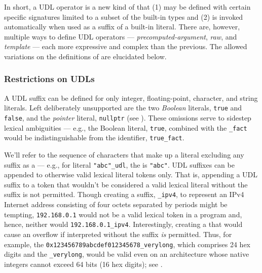 \noindent In short, a UDL operator is a new kind of  that
(1) may be defined with certain specific signatures limited to a subset
of the built-in types and (2) is invoked automatically when used as a
suffix of a built-in literal. There are, however, multiple ways to
define UDL operators --- \emph{precomputed-argument}, \emph{raw}, and
\emph{template} --- each more expressive and complex than the previous.
The allowed variations on the definitions of 
are elucidated below.

\subsubsection[Restrictions on UDLs]{Restrictions on UDLs}\label{restrictions-on-user-defined-literals-(udls)}

A UDL suffix can be defined for only integer, floating-point, character,
and string literals. Left deliberately unsupported are the two
\emph{Boolean} literals, \lstinline!true! and \lstinline!false!, and the
\emph{pointer} literal, \lstinline!nullptr! (see ). These omissions serve to sidestep
lexical ambiguities --- e.g., the Boolean literal, \lstinline!true!,
combined with the  \lstinline!_fact! would be
indistinguishable from the identifier, \lstinline!true_fact!.

We'll refer to the sequence of characters that make up a literal
excluding any suffix as a  --- e.g., for literal
\lstinline!"abc"_udl!, the  is \lstinline!"abc"!. UDL
suffixes can be appended to otherwise valid lexical literal tokens only.
That is, appending a UDL suffix to a token that
wouldn't be considered a valid lexical literal without the suffix is not permitted.
Though creating a suffix, \lstinline!_ipv4!, to
represent an IPv4 Internet address consisting of four octets separated
by periods might be tempting, \lstinline!192.168.0.1! would not be a valid lexical token in a
program and, hence, neither would \lstinline!192.168.0.1_ipv4!.
Interestingly, creating a  that
would cause an overflow if interpreted without the suffix \emph{is} permitted. Thus, for
example, the  \lstinline!0x123456789abcdef012345678_verylong!,
which comprises 24 hex digits and the 
\lstinline!_verylong!, would be valid even on an architecture whose native
integers cannot exceed 64 bits (16 hex digits); see .

